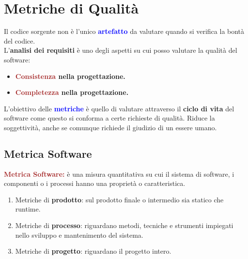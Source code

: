\chapter{Metriche di Qualità}
Il codice sorgente non è l'unico \textbf{\textcolor{blue}{artefatto}} da valutare quando si verifica la bontà del codice.\\
L'\textbf{analisi dei requisiti} è uno degli aspetti su cui posso valutare la qualità del software:
\begin{itemize}
    \item \textbf{\textcolor{brown}{Consistenza} nella progettazione.}
    \item \textbf{\textcolor{brown}{Completezza} nella progettazione.}
\end{itemize}

L'obiettivo delle \textbf{\textcolor{blue}{metriche}} è quello di valutare attraverso il \textbf{ciclo di vita} del software come questo si conforma a certe richieste di qualità.
Riduce la soggettività, anche se comunque richiede il giudizio di un essere umano.

\section{Metrica Software}
\begin{boxDef}
\textbf{\textcolor{brown}{Metrica Software:}} è una misura quantitativa su cui il sistema di software, i componenti o i processi hanno una proprietà o caratteristica.
\begin{enumerate}
    \item Metriche di \textbf{prodotto}: sul prodotto finale o intermedio sia statico che runtime.
    \item Metriche di \textbf{processo}: riguardano metodi, tecniche e strumenti impiegati nello sviluppo e mantenimento del sistema.
    \item Metriche di \textbf{progetto}: riguardano il progetto intero.
\end{enumerate}
\end{boxDef}

